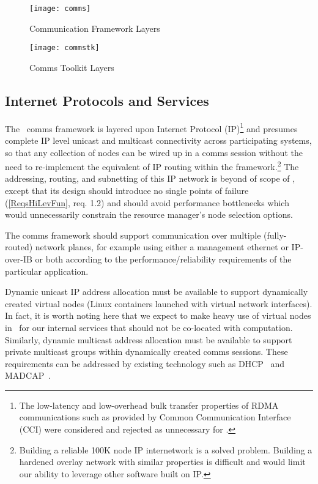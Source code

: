 \begin{figure}
\begin{minipage}[b]{0.45\linewidth}
\centering
\texttt{[image: comms]}
\caption{Communication Framework Layers}
\label{FigCommsLayers}
\end{minipage}
\hspace{0.5cm}
\begin{minipage}[b]{0.45\linewidth}
\centering
\texttt{[image: commstk]}
\caption{Comms Toolkit Layers}
\label{FigCommsTK}
\end{minipage}
\end{figure}

\subsection{Internet Protocols and Services}
\label{sect:commsIP}

The \ngrm\ comms framework is layered upon Internet Protocol (IP)\footnote{
The low-latency and low-overhead bulk transfer properties of RDMA
communications such as provided by Common Communication
Interface (CCI) were considered and rejected as unnecessary for \ngrm.}
and presumes complete IP level unicast and multicast connectivity across
participating systems, so that any
collection of nodes can be wired up in a comms session without
the need to re-implement the equivalent of IP routing within
the framework.\footnote{Building a reliable 100K node IP internetwork
is a solved problem.  Building a hardened overlay network with similar
properties is difficult and would limit our ability to leverage
other software built on IP.}
The addressing, routing, and subnetting of this IP network is beyond of
scope of \ngrm, except that its design should introduce no single
points of failure (\ref{ReqsHiLevFun}, req. 1.2)
and should avoid performance bottlenecks which
would unnecessarily constrain the resource manager's node selection options.

The comms framework should support communication over multiple
(fully-routed) network planes, for example using either a management
ethernet or IP-over-IB or both according to the performance/reliability
requirements of the particular application.

Dynamic unicast IP address allocation must be available to support
dynamically created virtual nodes (Linux containers launched with
virtual network interfaces).  In fact, it is worth noting here that
we expect to make heavy use of virtual nodes in \ngrm\ for our internal
services that should not be co-located with computation.
Similarly,
dynamic multicast address allocation must be available to support
private multicast groups within dynamically created comms sessions.
These requirements can be addressed by existing technology such as
DHCP~\cite{rfc2131} and MADCAP~\cite{rfc2730}.

